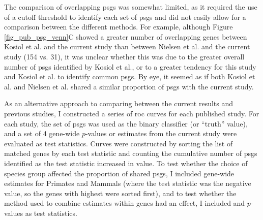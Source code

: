 The comparison of overlapping \acp{psg} was somewhat limited, as it
required the use of a cutoff threshold to identify each set of
\acp{psg} and did not easily allow for a comparison between the
different methods. For example, although Figure
\ref{fig_pub_psg_venn}C showed a greater number of overlapping genes
between Kosiol et al. and the current study than between Nielsen et
al. and the current study (154 vs. 31), it was unclear whether this
was due to the greater overall number of \acp{psg} identified by
Kosiol et al., or to a greater tendency for this study and Kosiol et
al. to identify common \acp{psg}. By eye, it seemed as if both Kosiol
et al. and Nielsen et al. shared a similar proportion of \acp{psg}
with the current study.

As an alternative approach to comparing between the current results
and previous studies, I constructed a series of \ac{roc} curves for
each published study. For each study, the set of \acp{psg} was used as
the binary classifier (or ``truth'' value), and a set of 4 gene-wide
$p$-values or \dnds estimates from the current study were evaluated as
test statistics. Curves were constructed by sorting the list of
matched genes by each test statistic and counting the cumulative
number of \acp{psg} identified as the test statistic increased in
value. To test whether the choice of species group affected the
proportion of shared \acp{psg}, I included gene-wide \dnds estimates
for Primates and Mammals (where the test statistic was the negative
\dnds value, so the genes with highest \dnds were sorted first), and
to test whether the method used to combine \sw estimates within genes
had an effect, I included \psgeone and \psghoch $p$-values as test
statistics.

